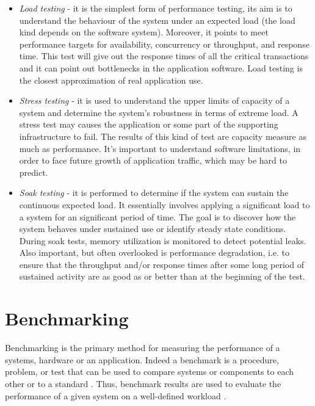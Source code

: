 \begin{itemize}
\item \textit{Load testing} - it is the simplest form of performance testing, its aim is to understand the behaviour of the system under an expected load (the load kind depends on the software system). Moreover, it points to meet performance targets for availability, concurrency or throughput, and response time. This test will give out the response times of all the critical transactions and it can point out bottlenecks in the application software. Load testing is the closest approximation of real application use.

\item \textit{Stress testing} -  it is used to understand the upper limits of capacity of a system and determine the system's robustness in terms of extreme load. A stress test may causes the application or some part of the supporting infrastructure to fail. The results of this kind of test are  capacity measure as much as performance. It's important to understand software limitations, in order to face future growth of application traffic, which may be hard to predict.

\item \textit{Soak testing} - it is performed to determine if the system can sustain the continuous expected load. It essentially involves applying a significant load to a system for an significant period of time. The goal is to discover how the system behaves under sustained use or identify steady state conditions. During soak tests, memory utilization is monitored to detect potential leaks. Also important, but often overlooked is performance degradation, i.e. to ensure that the throughput and/or response times after some long period of sustained activity are as good as or better than at the beginning of the test. 
\end{itemize} 

\section{Benchmarking}\label{sec:benchmarking}

Benchmarking is the primary method for measuring the performance of a systems, hardware or an application. Indeed a benchmark is a procedure, problem, or test that can be used to compare systems or components to each other or to a standard \cite{IEEEStd610.12-1990:glossary}. Thus, benchmark results are used to evaluate the performance of a given system on a well-defined workload \cite{Menasce:2001:CPW:560806}.

